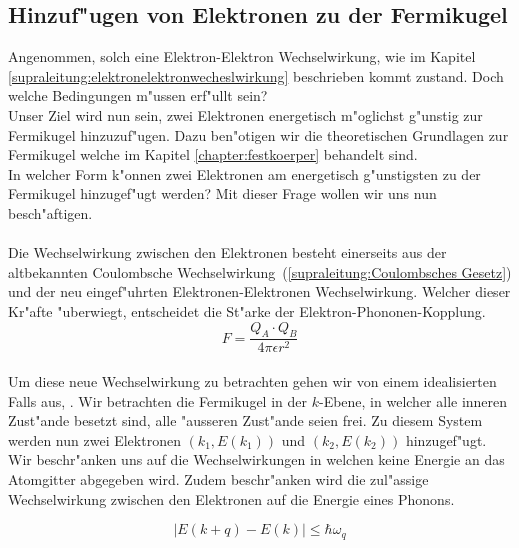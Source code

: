 \begin{refsection}

\section{Hinzuf"ugen von Elektronen zu der Fermikugel}
Angenommen, solch eine Elektron-Elektron Wechselwirkung, wie im Kapitel \ref{supraleitung:elektronelektronwecheslwirkung} beschrieben kommt zustand. Doch welche Bedingungen m"ussen erf"ullt sein?
\\
Unser Ziel wird nun sein, zwei Elektronen energetisch m"oglichst g"unstig zur Fermikugel hinzuzuf"ugen. Dazu ben"otigen wir die theoretischen Grundlagen zur Fermikugel welche im Kapitel \ref{chapter:festkoerper} behandelt sind.
\\
In welcher Form k"onnen zwei Elektronen am energetisch g"unstigsten zu der Fermikugel hinzugef"ugt werden? Mit dieser Frage wollen wir uns nun besch"aftigen.
\\
\\
Die Wechselwirkung zwischen den Elektronen besteht einerseits aus der altbekannten Coulombsche Wechselwirkung~(\ref{supraleitung:Coulombsches Gesetz}) und der neu eingef"uhrten Elektronen-Elektronen Wechselwirkung. Welcher dieser Kr"afte "uberwiegt, entscheidet die St"arke der Elektron-Phononen-Kopplung.
\\
\begin{equation}
F=\frac{Q_A\cdot Q_B}{4\pi\epsilon r^2}
\label{supraleitung:Coulombsches Gesetz}
\end{equation}
\\
Um diese neue Wechselwirkung zu betrachten gehen wir von einem idealisierten Falls aus, 
. 
Wir betrachten die Fermikugel in der $k$-Ebene, in welcher alle inneren Zust"ande besetzt sind, alle "ausseren Zust"ande seien frei. Zu diesem System werden nun zwei Elektronen $(k_1,E(k_1))$ und $(k_2,E(k_2))$ hinzugef"ugt. Wir beschr"anken uns auf die Wechselwirkungen in welchen keine Energie an das Atomgitter abgegeben wird. Zudem beschr"anken wird die zul"assige Wechselwirkung zwischen den Elektronen auf die Energie eines Phonons.

\begin{equation}
|E(k+q)-E(k)|\le\hbar\omega_q
\label{supraleitung:Phonon Energie}
\end{equation}


\end{refsection}
